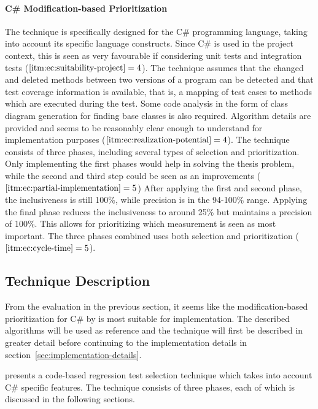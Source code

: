 \documentclass[a4paper,english,12pt]{report}
\begin{document}
\paragraph{C\# Modification-based Prioritization \citep{mansour2009regression}}
The technique is specifically designed for the C\# programming language, taking into account its specific language constructs. Since C\# is used in the project context, this is seen as very favourable if considering unit tests and integration tests ($\text{\ref{itm:ec:suitability-project}} = 4$). The technique assumes that the changed and deleted methods between two versions of a program can be detected and that test coverage information is available, that is, a mapping of test cases to methods which are executed during the test. Some code analysis in the form of class diagram generation for finding base classes is also required. Algorithm details are provided and seems to be reasonably clear enough to understand for implementation purposes ($\text{\ref{itm:ec:realization-potential}} = 4$). The technique consists of three phases, including several types of selection and prioritization. Only implementing the first phases would help in solving the thesis problem, while the second and third step could be seen as an improvements ($\text{\ref{itm:ec:partial-implementation}} = 5$) After applying the first and second phase, the inclusiveness is still 100\%, while precision is in the 94-100\% range. Applying the final phase reduces the inclusiveness to around 25\% but maintains a precision of 100\%. This allows for prioritizing which measurement is seen as most important. The three phases combined uses both selection and prioritization ($\text{\ref{itm:ec:cycle-time}} = 5$).

\subsection{Technique Description}\label{sec:technique-description}
From the evaluation in the previous section, it seems like the modification-based prioritization for C\# by \citet{mansour2009regression} is most suitable for implementation. The described algorithms will be used as reference and the technique will first be described in greater detail before continuing to the implementation details in section~\vref{sec:implementation-details}.

\citet{mansour2009regression} presents a code-based regression test selection technique which takes into account C\# specific features. The technique consists of three phases, each of which is discussed in the following sections.
\end{document}
